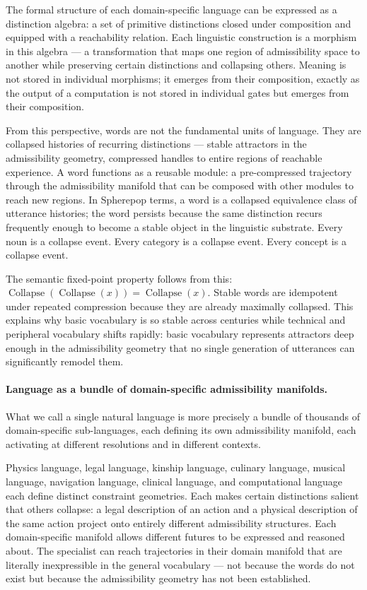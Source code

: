 \documentclass[12pt,a4paper]{article}
\begin{document}
The formal structure of each domain-specific language can be expressed as a distinction algebra: a set of primitive distinctions closed under composition and equipped with a reachability relation. Each linguistic construction is a morphism in this algebra — a transformation that maps one region of admissibility space to another while preserving certain distinctions and collapsing others. Meaning is not stored in individual morphisms; it emerges from their composition, exactly as the output of a computation is not stored in individual gates but emerges from their composition.

From this perspective, words are not the fundamental units of language. They are collapsed histories of recurring distinctions --- stable attractors in the admissibility geometry, compressed handles to entire regions of reachable experience. A word functions as a reusable module: a pre-compressed trajectory through the admissibility manifold that can be composed with other modules to reach new regions. In Spherepop terms, a word is a collapsed equivalence class of utterance histories; the word persists because the same distinction recurs frequently enough to become a stable object in the linguistic substrate. Every noun is a collapse event. Every category is a collapse event. Every concept is a collapse event.

The semantic fixed-point property follows from this: $\operatorname{Collapse}(\operatorname{Collapse}(x)) = \operatorname{Collapse}(x)$. Stable words are idempotent under repeated compression because they are already maximally collapsed. This explains why basic vocabulary is so stable across centuries while technical and peripheral vocabulary shifts rapidly: basic vocabulary represents attractors deep enough in the admissibility geometry that no single generation of utterances can significantly remodel them.

\paragraph{Language as a bundle of domain-specific admissibility manifolds.}
What we call a single natural language is more precisely a bundle of thousands of domain-specific sub-languages, each defining its own admissibility manifold, each activating at different resolutions and in different contexts.

Physics language, legal language, kinship language, culinary language, musical language, navigation language, clinical language, and computational language each define distinct constraint geometries. Each makes certain distinctions salient that others collapse: a legal description of an action and a physical description of the same action project onto entirely different admissibility structures. Each domain-specific manifold allows different futures to be expressed and reasoned about. The specialist can reach trajectories in their domain manifold that are literally inexpressible in the general vocabulary — not because the words do not exist but because the admissibility geometry has not been established.
\end{document}
